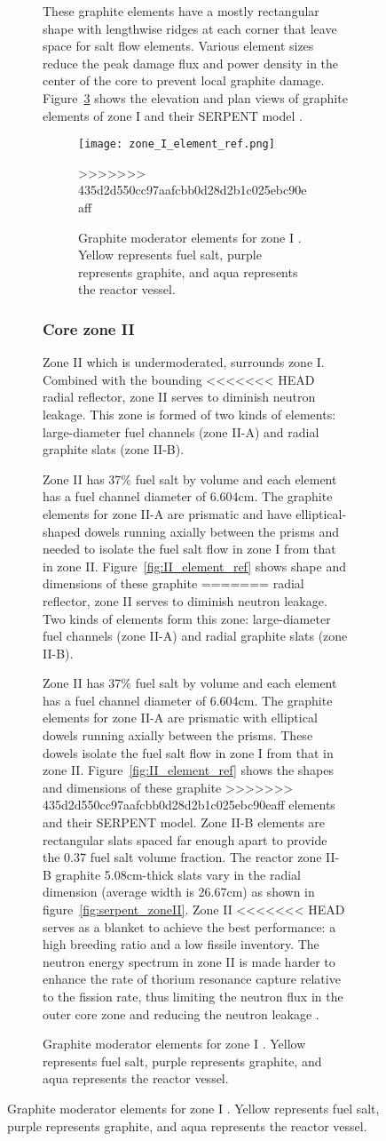 \begin{figure}[t!]
\begin{figure}[ht!]
These graphite elements have a mostly rectangular shape with lengthwise ridges 
at each corner that leave space for salt flow elements. Various element sizes 
reduce the peak damage flux and power density in the center of the core to 
prevent local graphite damage.  Figure~\ref{fig:I_element_ref} shows the 
elevation and plan views of graphite elements of zone I 
\cite{robertson_conceptual_1971} and their SERPENT model 
\cite{rykhlevskii_full-core_2017}.

\begin{figure}[ht!] %
  \texttt{[image: zone\_I\_element\_ref.png]}
  \caption{Graphite moderator elements for zone I 
  \cite{robertson_conceptual_1971,rykhlevskii_full-core_2017}.  Yellow 
  represents fuel salt, purple represents graphite, and aqua represents the 
  reactor vessel.}
>>>>>>> 435d2d550cc97aafcbb0d28d2b1c025ebc90eaff
  \label{fig:I_element_ref}
\end{figure}

\subsubsection{Core zone II}
Zone II which is undermoderated, surrounds zone I. Combined with the bounding 
<<<<<<< HEAD
radial reflector, zone II serves to diminish neutron leakage. This zone is 
formed of two kinds of elements: large-diameter fuel channels (zone II-A) and 
radial graphite slats (zone II-B). 

Zone II has 37\% fuel salt by volume and each element has a fuel channel 
diameter of 6.604cm. The graphite elements for zone II-A are prismatic and have 
elliptical-shaped dowels running axially between the prisms and needed to 
isolate the fuel salt flow in zone I from that in zone II. 
Figure~\ref{fig:II_element_ref} shows shape and dimensions of these graphite 
=======
radial reflector, zone II serves to diminish neutron leakage. Two kinds of 
elements form this zone: large-diameter fuel channels (zone II-A) and 
radial graphite slats (zone II-B). 

Zone II has 37\% fuel salt by volume and each element has a fuel channel 
diameter of 6.604cm. The graphite elements for zone II-A are prismatic with
elliptical dowels running axially between the prisms. These dowels
isolate the fuel salt flow in zone I from that in zone II. 
Figure~\ref{fig:II_element_ref} shows the shapes and dimensions of these graphite 
>>>>>>> 435d2d550cc97aafcbb0d28d2b1c025ebc90eaff
elements and their SERPENT model. Zone II-B elements are rectangular slats 
spaced far enough apart to provide the 0.37 fuel salt volume fraction. The 
reactor zone II-B graphite 5.08cm-thick slats vary in the radial dimension 
(average width is 26.67cm) as shown in figure~\ref{fig:serpent_zoneII}. Zone II 
<<<<<<< HEAD
serves as a blanket to achieve the best performance: a high breeding ratio and a 
low fissile inventory. The neutron energy spectrum in zone II is made harder to 
enhance the rate of thorium resonance capture relative to the fission rate, thus 
limiting the neutron flux in the outer core zone and reducing the neutron 
leakage \cite{robertson_conceptual_1971}. 


\end{figure}
\end{figure}
